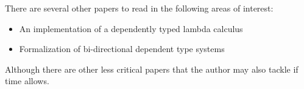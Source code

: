 There are several other papers to read in the following
areas of interest:

\begin{itemize}
\item An implementation of a dependently typed lambda
  calculus \cite{ATutorialImplementationOfDTLC}
\item Formalization of bi-directional dependent type systems \cite{TypesWhoSayNi}
\end{itemize}

Although there are other less critical papers that the
author may also tackle if time allows.
